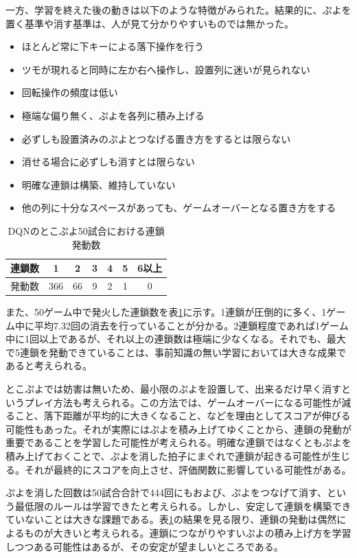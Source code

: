 \documentclass[12pt]{jsarticle}
\begin{document}
一方、学習を終えた後の動きは以下のような特徴がみられた。結果的に、ぷよを置く基準や消す基準は、人が見て分かりやすいものでは無かった。
\begin{itemize}
  \item ほとんど常に下キーによる落下操作を行う
  \item ツモが現れると同時に左か右へ操作し、設置列に迷いが見られない
  \item 回転操作の頻度は低い
  \item 極端な偏り無く、ぷよを各列に積み上げる
  \item 必ずしも設置済みのぷよとつなげる置き方をするとは限らない
  \item 消せる場合に必ずしも消すとは限らない
  \item 明確な連鎖は構築、維持していない
  \item 他の列に十分なスペースがあっても、ゲームオーバーとなる置き方をする
\end{itemize}

\begin{table}[htb]
\begin{center}
\caption{DQNのとこぷよ50試合における連鎖発動数} \label{tab:dqn_chain_tokopuyo}
\begin{tabular}{|l|c|c|c|c|c|c|} \hline
連鎖数 & 1 & 2 & 3 & 4 & 5 & 6以上\\ \hline
発動数 & 366 & 66 & 9 & 2 & 1 & 0\\ \hline
\end{tabular}
\end{center}
\end{table}

また、50ゲーム中で発火した連鎖数を表\ref{tab:dqn_chain_tokopuyo}に示す。1連鎖が圧倒的に多く、1ゲーム中に平均7.32回の消去を行っていることが分かる。2連鎖程度であれば1ゲーム中に1回以上であるが、それ以上の連鎖数は極端に少なくなる。それでも、最大で5連鎖を発動できていることは、事前知識の無い学習においては大きな成果であると考えられる。

とこぷよでは妨害は無いため、最小限のぷよを設置して、出来るだけ早く消すというプレイ方法も考えられる。この方法では、ゲームオーバーになる可能性が減ること、落下距離が平均的に大きくなること、などを理由としてスコアが伸びる可能性もあった。それが実際にはぷよを積み上げてゆくことから、連鎖の発動が重要であることを学習した可能性が考えられる。明確な連鎖ではなくともぷよを積み上げておくことで、ぷよを消した拍子にまぐれで連鎖が起きる可能性が生じる。それが最終的にスコアを向上させ、評価関数に影響している可能性がある。

ぷよを消した回数は50試合合計で444回にもおよび、ぷよをつなげて消す、という最低限のルールは学習できたと考えられる。しかし、安定して連鎖を構築できていないことは大きな課題である。表\ref{tab:dqn_chain_tokopuyo}の結果を見る限り、連鎖の発動は偶然によるものが大きいと考えられる。連鎖につながりやすいぷよの積み上げ方を学習しつつある可能性はあるが、その安定が望ましいところである。
\end{document}
